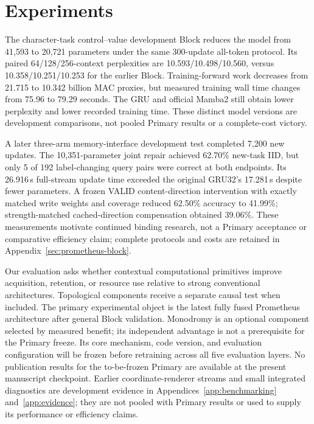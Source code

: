 \section{Experiments}

The character-task control--value development Block reduces the model
from 41,593 to 20,721 parameters under the same 300-update all-token
protocol. Its paired 64/128/256-context perplexities are
10.593/10.498/10.560, versus 10.358/10.251/10.253 for the earlier Block.
Training-forward work decreases from 21.715 to 10.342 billion MAC proxies,
but measured training wall time changes from 75.96 to 79.29 seconds.
The GRU and official Mamba2 still obtain lower perplexity and lower
recorded training time. These distinct model versions are development
comparisons, not pooled Primary results or a complete-cost victory.
\label{sec:experiments}


A later three-arm memory-interface development test completed 7,200 new
updates. The 10,351-parameter joint repair achieved 62.70\% new-task IID,
but only 5 of 192 label-changing query pairs were correct at both endpoints.
Its 26.916\,s full-stream update time exceeded the original GRU32's
17.281\,s despite fewer parameters. A frozen VALID content-direction
intervention with exactly matched write weights and coverage reduced
62.50\% accuracy to 41.99\%; strength-matched cached-direction
compensation obtained 39.06\%. These measurements motivate continued
binding research, not a Primary acceptance or comparative efficiency claim;
complete protocols and costs are retained in Appendix~\ref{sec:prometheus-block}.

Our evaluation asks whether contextual computational primitives improve
acquisition, retention, or resource use relative to strong conventional
architectures. Topological components receive a separate causal test when
included. The primary experimental object is the latest fully fused
Prometheus architecture after general Block validation. Monodromy is an
optional component selected by measured benefit; its independent advantage
is not a prerequisite for the Primary freeze. Its core mechanism,
code version, and evaluation configuration will be frozen before retraining
across all five evaluation layers. No publication results for the to-be-frozen
Primary are available at the present manuscript checkpoint. Earlier coordinate-renderer
streams and small integrated diagnostics are development evidence in
Appendices~\ref{app:benchmarking} and~\ref{app:evidence}; they are not pooled
with Primary results or used to supply its performance or efficiency claims.

